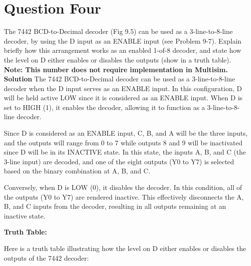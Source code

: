 \documentclass[a4paper,12]{article}
\begin{document}
\newpage
\section{Question Four}
The 7442 BCD-to-Decimal decoder (Fig 9.5) can be used as a 3-line-to-8-line decoder, by using the D input as an ENABLE input (see Problem 9-7). Explain briefly how this arrangement works as an enabled 1-of-8 decoder, and state how the level on D either enables or disables the outputs (show in a truth table). \textbf{Note: This number does not require implementation in Multisim.}\\

\textbf{Solution} 
The 7442 BCD-to-Decimal decoder can be used as a 3-line-to-8-line decoder when the D input serves as an ENABLE input. In this configuration, D will be held active LOW since it is considered as an ENABLE input. When D is set to HIGH (1), it enables the decoder, allowing it to function as a 3-line-to-8-line decoder. 

Since D is considered as an ENABLE input, C, B, and A will be the three inputs, and the outputs will range from 0 to 7 while outputs 8 and 9 will be inactivated since D will be in its INACTIVE state. In this state, the inputs A, B, and C (the 3-line input) are decoded, and one of the eight outputs (Y0 to Y7) is selected based on the binary combination at A, B, and C.

Conversely, when D is LOW (0), it disables the decoder. In this condition, all of the outputs (Y0 to Y7) are rendered inactive. This effectively disconnects the A, B, and C inputs from the decoder, resulting in all outputs remaining at an inactive state.

\textbf{Truth Table:}

Here is a truth table illustrating how the level on D either enables or disables the outputs of the 7442 decoder:
\end{document}
